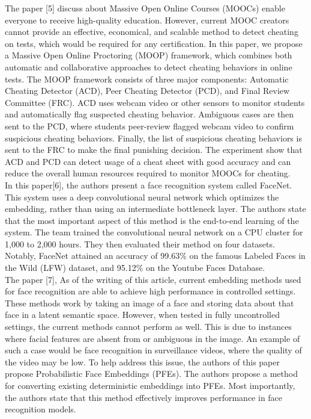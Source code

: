 \documentclass[12pt]{report}
\begin{document}
The paper [5] discuss about  Massive Open Online Courses (MOOCs) enable everyone to receive high-quality education. However, current MOOC creators cannot provide an effective, economical, and scalable method to detect cheating on tests, which would be required for any certification. In this paper, we propose a Massive Open Online Proctoring (MOOP) framework, which combines both automatic and collaborative approaches to detect cheating behaviors in online tests. The MOOP framework consists of three major components: Automatic Cheating Detector (ACD), Peer Cheating Detector (PCD), and Final Review Committee (FRC). ACD uses webcam video or other sensors to monitor students and automatically flag suspected cheating behavior. Ambiguous cases are then sent to the PCD, where students peer-review flagged webcam video to confirm suspicious cheating behaviors. Finally, the list of suspicious cheating behaviors is sent to the FRC to make the final punishing decision. The experiment show that ACD and PCD can detect usage of a cheat sheet with good accuracy and can reduce the overall human resources required to monitor MOOCs for cheating.\\

 In this paper[6], the authors present a face recognition system called FaceNet. This system uses a deep convolutional neural network which optimizes the embedding, rather than using an intermediate bottleneck layer. The authors state that the most important aspect of this method is the end-to-end learning of the system.  The team trained the convolutional neural network on a CPU cluster for 1,000 to 2,000 hours. They then evaluated their method on four datasets. Notably, FaceNet attained an accuracy of 99.63\% on the famous Labeled Faces in the Wild (LFW) dataset, and 95.12\% on the Youtube Faces Database. \\

The paper [7], As of the writing of this article, current embedding methods used for face recognition are able to achieve high performance in controlled settings. These methods work by taking an image of a face and storing data about that face in a latent semantic space. However, when tested in fully uncontrolled settings, the current methods cannot perform as well. This is due to instances where facial features are absent from or ambiguous in the image. An example of such a case would be face recognition in surveillance videos, where the quality of the video may be low.  To help address this issue, the authors of this paper propose Probabilistic Face Embeddings (PFEs). The authors propose a method for converting existing deterministic embeddings into PFEs. Most importantly, the authors state that this method effectively improves performance in face recognition models.\\
\end{document}
